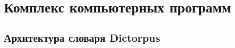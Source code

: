 \chapter{Комплекс компьютерных программ} \label{chapt_complex_software}









\section{Архитектура словаря Dictorpus} \label{sect_dictionary}







